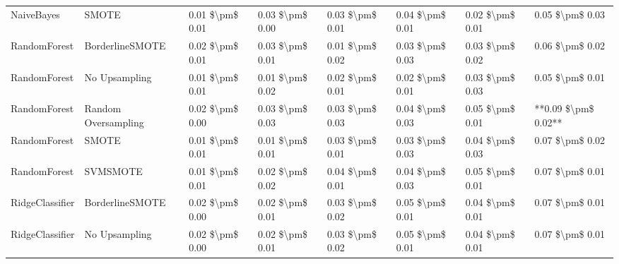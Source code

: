 \begin{tabular}{llllllll}
                     NaiveBayes &                         SMOTE & 0.01 \$\textbackslash pm\$ 0.01 &           0.03 \$\textbackslash pm\$ 0.00 &       0.03 \$\textbackslash pm\$ 0.01 &        0.04 \$\textbackslash pm\$ 0.01 &                         0.02 \$\textbackslash pm\$ 0.01 &     0.05 \$\textbackslash pm\$ 0.03 \\
                   RandomForest &               BorderlineSMOTE & 0.02 \$\textbackslash pm\$ 0.01 &           0.03 \$\textbackslash pm\$ 0.01 &       0.01 \$\textbackslash pm\$ 0.02 &        0.03 \$\textbackslash pm\$ 0.03 &                         0.03 \$\textbackslash pm\$ 0.02 &     0.06 \$\textbackslash pm\$ 0.02 \\
                   RandomForest &                 No Upsampling & 0.01 \$\textbackslash pm\$ 0.01 &           0.01 \$\textbackslash pm\$ 0.02 &       0.02 \$\textbackslash pm\$ 0.01 &        0.02 \$\textbackslash pm\$ 0.01 &                         0.03 \$\textbackslash pm\$ 0.03 &     0.05 \$\textbackslash pm\$ 0.01 \\
                   RandomForest &           Random Oversampling & 0.02 \$\textbackslash pm\$ 0.00 &           0.03 \$\textbackslash pm\$ 0.03 &       0.03 \$\textbackslash pm\$ 0.03 &        0.04 \$\textbackslash pm\$ 0.03 &                         0.05 \$\textbackslash pm\$ 0.01 & **0.09 \$\textbackslash pm\$ 0.02** \\
                   RandomForest &                         SMOTE & 0.01 \$\textbackslash pm\$ 0.01 &           0.01 \$\textbackslash pm\$ 0.01 &       0.03 \$\textbackslash pm\$ 0.01 &        0.03 \$\textbackslash pm\$ 0.03 &                         0.04 \$\textbackslash pm\$ 0.03 &     0.07 \$\textbackslash pm\$ 0.02 \\
                   RandomForest &                      SVMSMOTE & 0.01 \$\textbackslash pm\$ 0.01 &           0.02 \$\textbackslash pm\$ 0.02 &       0.04 \$\textbackslash pm\$ 0.01 &        0.04 \$\textbackslash pm\$ 0.03 &                         0.05 \$\textbackslash pm\$ 0.01 &     0.07 \$\textbackslash pm\$ 0.01 \\
                RidgeClassifier &               BorderlineSMOTE & 0.02 \$\textbackslash pm\$ 0.00 &           0.02 \$\textbackslash pm\$ 0.01 &       0.03 \$\textbackslash pm\$ 0.02 &        0.05 \$\textbackslash pm\$ 0.01 &                         0.04 \$\textbackslash pm\$ 0.01 &     0.07 \$\textbackslash pm\$ 0.01 \\
                RidgeClassifier &                 No Upsampling & 0.02 \$\textbackslash pm\$ 0.00 &           0.02 \$\textbackslash pm\$ 0.01 &       0.03 \$\textbackslash pm\$ 0.02 &        0.05 \$\textbackslash pm\$ 0.01 &                         0.04 \$\textbackslash pm\$ 0.01 &     0.07 \$\textbackslash pm\$ 0.01 \\

\end{tabular}
